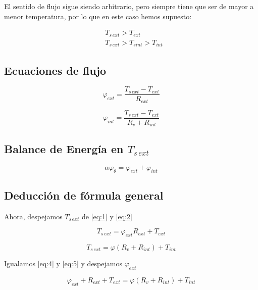 \documentclass[12pt]{article}
\begin{document}
El sentido de flujo sigue siendo arbitrario, pero siempre tiene que ser de mayor a menor temperatura, por lo que en este caso hemos supuesto:

\[ \begin{aligned} 
    & T_{ s \, ext } > T_{ ext } \\
    & T_{ s \, ext } > T_{ s int } > T_{ int }
\end{aligned} \]

\subsection{Ecuaciones de flujo}

\begin{equation}\label{eq:1}
    \varphi _{ ext } = \frac{ T_{ s \, ext } - T_{ ext } }{ R_{ ext } }
\end{equation}

\begin{equation}\label{eq:2}
    \varphi _{ int } = \frac{ T_{ s \, ext } - T_{ ext } }{ R_v + R_{ int } }
\end{equation}

\subsection{Balance de Energía en $ T_{ s \, ext } $}

\begin{equation}\label{eq:3}
    \alpha \varphi _\theta = \varphi _{ ext } + \varphi _{ int }
\end{equation}

\subsection{Deducción de fórmula general}

Ahora, despejamos $ T_{ s \, ext } $ de \ref{eq:1} y \ref{eq:2}

\begin{equation} \label{eq:4}
    T_{ s \, ext} = \varphi _{ ext } R_{ ext } + T_{ ext }
\end{equation}

\begin{equation} \label{eq:5}
    T_{ s \, ext } = \varphi \left( R_v + R_{ int } \right) + T_{ int }
\end{equation}

Igualamos \ref{eq:4} y \ref{eq:5} y despejamos $ \varphi _{ ext } $

\[ \varphi _{ ext } + R_{ ext } + T_{ ext } = \varphi \left( R_v + R_{ int } \right) + T_{ int } \]
\end{document}

